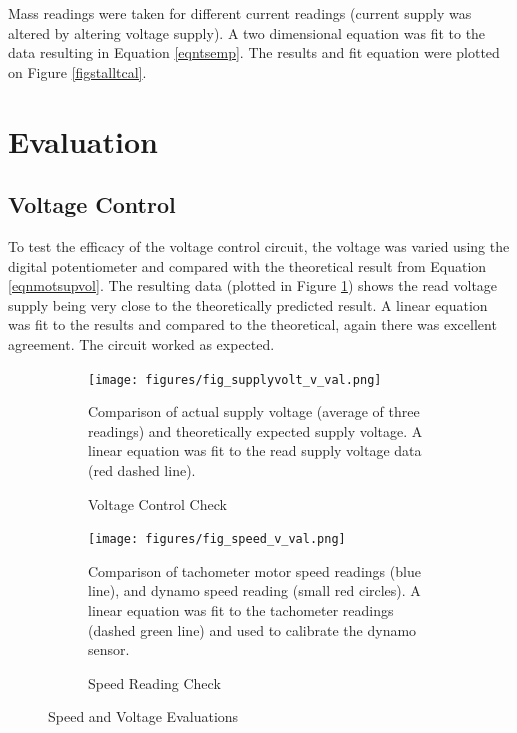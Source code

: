 \documentclass[twoside,a4]{report}
\begin{document}
	\noindent
	Mass readings were taken for different current readings (current supply was altered by altering voltage supply). A two dimensional equation was fit to the data resulting in Equation \ref{eqntsemp}. The results and fit equation were plotted on Figure \ref{figstalltcal}.

	\section{Evaluation} %
	
	\subsection*{Voltage Control}
	To test the efficacy of the voltage control circuit, the voltage was varied using the digital potentiometer and compared with the theoretical result from Equation \ref{eqnmotsupvol}. The resulting data (plotted in Figure \ref{figvoltvval}) shows the read voltage supply being very close to the theoretically predicted result. A linear equation was fit to the results and compared to the theoretical, again there was excellent agreement. The circuit worked as expected.
	\begin{figure}[!htb]
		\centering
		\begin{subfigure}[t]{0.45\textwidth}
			\centering
			\texttt{[image: figures/fig\_supplyvolt\_v\_val.png]}
			\caption{Voltage Control Check}
			\label{figvoltvval}
			\footnotesize
			Comparison of actual supply voltage (average of three readings) and theoretically expected supply voltage. A linear equation was fit to the read supply voltage data (red dashed line).
		\end{subfigure}
		\begin{subfigure}[t]{0.45\textwidth}
			\centering
			\texttt{[image: figures/fig\_speed\_v\_val.png]}
			\caption{Speed Reading Check}
			\label{figdynocheck}
			\footnotesize
			Comparison of tachometer motor speed readings (blue line), and dynamo speed reading (small red circles). A linear equation was fit to the tachometer readings (dashed green line) and used to calibrate the dynamo sensor.
		\end{subfigure}
		\label{figspeecal}
		\caption{Speed and Voltage Evaluations}
	\end{figure}
\end{document}
